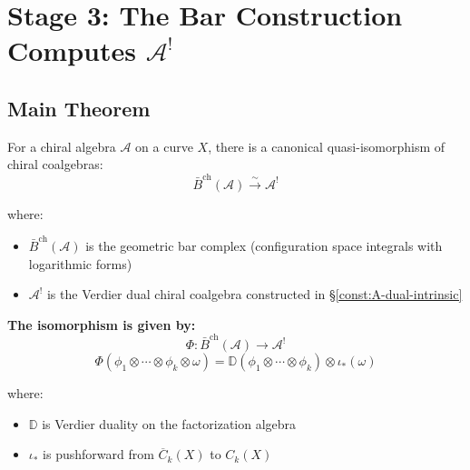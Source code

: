 \section{Stage 3: The Bar Construction Computes $\mathcal{A}^!$}

\subsection{Main Theorem}

\begin{theorem}[Bar Construction = Verdier Dual via NAP]\label{thm:bar-computes-dual}
For a chiral algebra $\mathcal{A}$ on a curve $X$, there is a canonical quasi-isomorphism of chiral coalgebras:
$$\bar{B}^{\text{ch}}(\mathcal{A}) \xrightarrow{\sim} \mathcal{A}^!$$

where:
\begin{itemize}
\item $\bar{B}^{\text{ch}}(\mathcal{A})$ is the geometric bar complex (configuration space integrals with logarithmic forms)
\item $\mathcal{A}^!$ is the Verdier dual chiral coalgebra constructed in \S\ref{const:A-dual-intrinsic}
\end{itemize}

\textbf{The isomorphism is given by:}
$$\Phi: \bar{B}^{\text{ch}}(\mathcal{A}) \to \mathcal{A}^!$$
$$\Phi(\phi_1 \otimes \cdots \otimes \phi_k \otimes \omega) = \mathbb{D}(\phi_1 \otimes \cdots \otimes \phi_k) \otimes \iota_*(\omega)$$

where:
\begin{itemize}
\item $\mathbb{D}$ is Verdier duality on the factorization algebra
\item $\iota_*$ is pushforward from $\overline{C}_k(X)$ to $C_k(X)$
\end{itemize}
\end{theorem}

